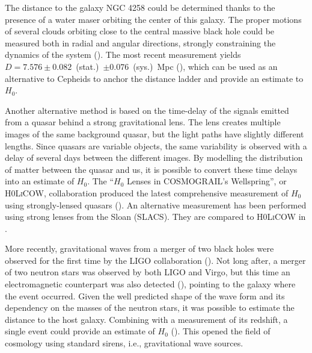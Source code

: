     The distance to the galaxy NGC 4258 could be determined thanks to the presence of a 
    water maser orbiting the center of this galaxy. The proper motions of several
    clouds orbiting close to the central massive black hole could be measured both 
    in radial and angular directions, strongly constraining the dynamics of the system
    (\cite{herrnsteinGeometricDistanceGalaxy1999b}).
    The most recent measurement yields $D = 7.576\pm0.082$~(stat.)~$\pm0.076$~(sys.)~Mpc
    (\cite{reidImprovedDistanceNGC2019}), which can be used as an alternative
    to Cepheids to anchor the 
    distance ladder and provide an estimate to $H_0$. 


    Another alternative method is based on the time-delay of the signals emitted from 
    a quasar behind a strong gravitational lens. The lens creates multiple images of the
    same background quasar, but the light paths have slightly different lengths. 
    Since quasars are variable objects, the same variability is observed with a delay of 
    several days between the different images. 
    By modelling the distribution of matter between the quasar and us, 
    it is possible to convert these time delays into an estimate of $H_0$.
    The ``$H_0$ Lenses in COSMOGRAIL's Wellspring'', or \textsc{H0LiCOW}, collaboration 
    produced the latest comprehensive measurement of $H_0$ using strongly-lensed quasars
    (\cite{wongH0LiCOWXIIICent2019}). 
    An alternative measurement has been performed using strong lenses from the Sloan (SLACS). 
    They are compared to \textsc{H0LiCOW} in \cite{birrerTDCOSMOIVHierarchical2020}. 
    
    More recently, gravitational waves from a merger of two black holes were 
    observed for the first time by the LIGO collaboration
    (\cite{theligoscientificcollaborationObservationGravitationalWaves2016}). 
    Not long after, a merger of two neutron stars was observed by both LIGO and Virgo,
    but this time an electromagnetic counterpart was also detected
    (\cite{theligoscientificcollaborationGW170817ObservationGravitational2017}), 
    pointing to the galaxy where the event occurred. Given the well predicted 
    shape of the wave form and its dependency on the masses of the neutron stars,
    it was possible to estimate the distance to the host galaxy. Combining with 
    a measurement of its redshift, a single event could provide an estimate of 
    $H_0$ (\cite{abbottGravitationalwaveStandardSiren2017b}). This opened the 
    field of cosmology using standard sirens, i.e., gravitational wave sources. 

